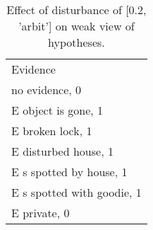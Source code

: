 \begin{table}\begin{tabular}{l}\toprule\multirow{2}{*}{Evidence} \\\\\midrule
no evidence, 0 & \\E object is gone, 1 & \\E broken lock, 1 & \\E disturbed house, 1 & \\E s spotted by house, 1 & \\E s spotted with goodie, 1 & \\E private, 0 & \\\bottomrule\end{tabular}\caption{Effect of disturbance of [0.2, 'arbit'] on weak view of hypotheses.}\end{table}